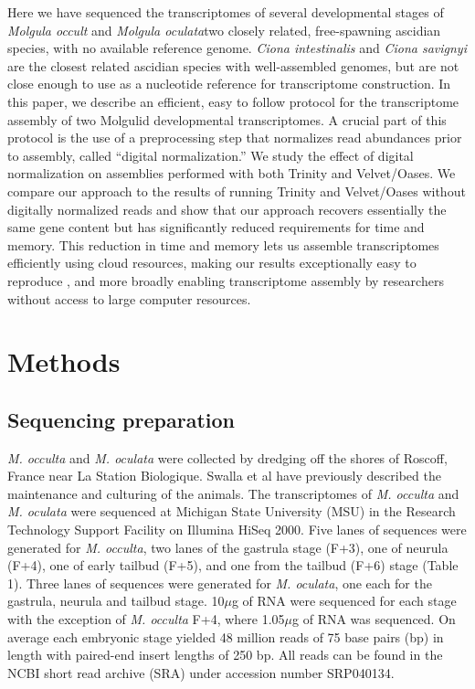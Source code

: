 \documentclass[fleqn,10pt]{wlpeerj}
\begin{document}
Here we have sequenced the transcriptomes of several developmental stages of \textit{Molgula occult} and \textit{Molgula oculata}\textemdash two closely related, free-spawning ascidian species, with no available reference genome. \textit{Ciona intestinalis} and \textit{Ciona savignyi} are the closest related ascidian species with well-assembled genomes, but are not close enough to use as a nucleotide reference for transcriptome construction. In this paper, we describe an efficient, easy to follow protocol for the transcriptome assembly of two Molgulid developmental transcriptomes. A crucial part of this protocol is the use of a preprocessing step that normalizes read abundances prior to assembly, called ``digital normalization.'' We study the effect of digital normalization on assemblies performed with both Trinity and Velvet/Oases.  We compare our approach to the results of running Trinity and Velvet/Oases without digitally normalized reads and show that our approach recovers essentially the same gene content but has significantly reduced requirements for time and memory.  This reduction in time and memory lets us assemble transcriptomes efficiently using cloud resources, making our results exceptionally easy to reproduce \citep{haas_novo_2013}, and more broadly enabling transcriptome assembly by researchers without access to large computer resources.

\section{Methods}
\subsection{Sequencing preparation}
\textit{M. occulta} and \textit{M. oculata} were collected by dredging off the shores of Roscoff, France near La Station Biologique. Swalla et al have previously described the maintenance \citep{swalla_interspecific_1990} and culturing \citep{swalla_multigene_1999} of the animals. The transcriptomes of \textit{M. occulta} and \textit{M. oculata} were sequenced at Michigan State University (MSU) in the Research Technology Support Facility on Illumina HiSeq 2000. Five lanes of sequences were generated for \textit{M. occulta}, two lanes of the gastrula stage (F+3), one of neurula (F+4), one of early tailbud (F+5), and one from the tailbud (F+6) stage (Table 1). Three lanes of sequences were generated for \textit{M. oculata}, one each for the gastrula, neurula and tailbud stage. 10$\mu$g of RNA were sequenced for each stage with the exception of \textit{M. occulta} F+4, where 1.05$\mu$g of RNA was sequenced. On average each embryonic stage yielded 48 million reads of 75 base pairs (bp) in length with paired-end insert lengths of 250 bp. All reads can be found in the NCBI short read archive (SRA) under accession number SRP040134. 
\end{document}
